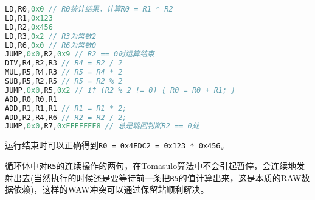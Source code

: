 \documentclass[12pt, UTF8]{article}
\begin{document}
\begin{lstlisting}[language = C++, morekeywords = { LD, JUMP, DIV, MUL, SUB, ADD }]
LD,R0,0x0 // R0统计结果，计算R0 = R1 * R2
LD,R1,0x123
LD,R2,0x456
LD,R3,0x2 // R3为常数2
LD,R6,0x0 // R6为常数0
JUMP,0x0,R2,0x9 // R2 == 0时运算结束
DIV,R4,R2,R3 // R4 = R2 / 2
MUL,R5,R4,R3 // R5 = R4 * 2
SUB,R5,R2,R5 // R5 = R2 % 2
JUMP,0x0,R5,0x2 // if (R2 % 2 != 0) { R0 = R0 + R1; }
ADD,R0,R0,R1
ADD,R1,R1,R1 // R1 = R1 * 2;
ADD,R2,R4,R6 // R2 = R2 / 2;
JUMP,0x0,R7,0xFFFFFFF8 // 总是跳回判断R2 == 0处
\end{lstlisting}

运行结束时可以正确得到\lstinline|R0 = 0x4EDC2 = 0x123 * 0x456|。

循环体中对\lstinline|R5|的连续操作的两句，在Tomasulo算法中不会引起暂停，会连续地发射出去(当然执行的时候还是要等待前一条把\lstinline|R5|的值计算出来，这是本质的RAW数据依赖)，这样的WAW冲突可以通过保留站顺利解决。
\end{document}
